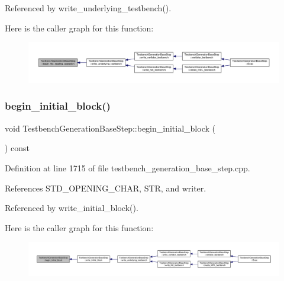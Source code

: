 Referenced by write\+\_\+underlying\+\_\+testbench().

Here is the caller graph for this function\+:
\nopagebreak
\begin{figure}[H]
\begin{center}
\leavevmode
\includegraphics[width=350pt]{dc/d02/classTestbenchGenerationBaseStep_ab0b8f178bb3899f2d4a0ba1537673fbc_icgraph}
\end{center}
\end{figure}
\mbox{\label{classTestbenchGenerationBaseStep_a0cc1e31a8699e752f6913b9f5b3d2f07}} 
\subsubsection{\texorpdfstring{begin\+\_\+initial\+\_\+block()}{begin\_initial\_block()}}
{\footnotesize\ttfamily void Testbench\+Generation\+Base\+Step\+::begin\+\_\+initial\+\_\+block (\begin{DoxyParamCaption}{ }\end{DoxyParamCaption}) const\hspace{0.3cm}{\ttfamily [protected]}}



Definition at line 1715 of file testbench\+\_\+generation\+\_\+base\+\_\+step.\+cpp.



References S\+T\+D\+\_\+\+O\+P\+E\+N\+I\+N\+G\+\_\+\+C\+H\+AR, S\+TR, and writer.



Referenced by write\+\_\+initial\+\_\+block().

Here is the caller graph for this function\+:
\nopagebreak
\begin{figure}[H]
\begin{center}
\leavevmode
\includegraphics[width=350pt]{dc/d02/classTestbenchGenerationBaseStep_a0cc1e31a8699e752f6913b9f5b3d2f07_icgraph}
\end{center}
\end{figure}
\mbox{\label{classTestbenchGenerationBaseStep_a2eb22c9083dd50cf754d3775697e0de0}} 
